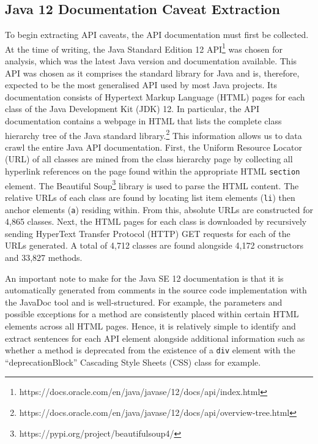 \subsection{Java 12 Documentation Caveat Extraction}
\label{subsec:info-caveat-extract}
To begin extracting API caveats, the API documentation must first be collected. At the time of writing, the Java Standard Edition 12 API\footnote{https://docs.oracle.com/en/java/javase/12/docs/api/index.html} was chosen for analysis, which was the latest Java version and documentation available. This API was chosen as it comprises the standard library for Java and is, therefore, expected to be the most generalised API used by most Java projects. Its documentation consists of Hypertext Markup Language (HTML) pages for each class of the Java Development Kit (JDK) 12. In particular, the API documentation contains a webpage in HTML that lists the complete class hierarchy tree of the Java standard library.\footnote{https://docs.oracle.com/en/java/javase/12/docs/api/overview-tree.html} This information allows us to data crawl the entire Java API documentation. First, the Uniform Resource Locator (URL) of all classes are mined from the class hierarchy page by collecting all hyperlink references on the page found within the appropriate HTML \lstinline{section} element. The Beautiful Soup\footnote{https://pypi.org/project/beautifulsoup4/} library is used to parse the HTML content. The relative URLs of each class are found by locating list item elements (\lstinline{li}) then anchor elements (\lstinline{a}) residing within. From this, absolute URLs are constructed for 4,865 classes. Next, the HTML pages for each class is downloaded by recursively sending HyperText Transfer Protocol (HTTP) GET requests for each of the URLs generated. A total of 4,712 classes are found alongside 4,172 constructors and 33,827 methods. \bigbreak

An important note to make for the Java SE 12 documentation is that it is automatically generated from comments in the source code implementation with the JavaDoc tool and is well-structured. For example, the parameters and possible exceptions for a method are consistently placed within certain HTML elements across all HTML pages. Hence, it is relatively simple to identify and extract sentences for each API element alongside additional information such as whether a method is deprecated from the existence of a \lstinline{div} element with the ``deprecationBlock'' Cascading Style Sheets (CSS) class for example.\bigbreak

